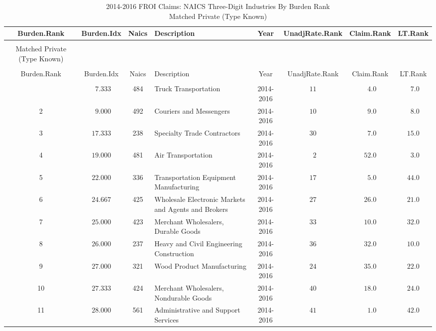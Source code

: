 \documentclass[9pt, oneside]{article}   	%
\begin{document}
\begin{longtable}{cccp{2.0in}cccc}
\caption{2014-2016 FROI Claims: NAICS Three-Digit Industries By Burden Rank\\ Matched Private (Type Known)}\\ 
\toprule
 Burden.Rank & Burden.Idx & Naics & Description & Year & UnadjRate.Rank & Claim.Rank & \multicolumn{1}{c}{LT.Rank} \\ 
   \midrule
   \hline
\endfirsthead
\caption[]{2014-2016 FROI Claims: NAICS Three-Digit Industries By Burden Rank\\ Matched Private (Type Known)}\\ 


\label{Table: 10b_burdenFull}\\

\hline
\toprule
 Burden.Rank & Burden.Idx & Naics & Description & Year & UnadjRate.Rank & Claim.Rank & \multicolumn{1}{c}{LT.Rank} \\ 
   \midrule\\ [-1\normalbaselineskip]\hline\endhead\hline\endfoot
1  & $\phantom{0}7.333$ & 484 & Truck Transportation & 2014-2016 & $11$ & $\phantom{0}4.0$ & $\phantom{0}7.0$ \\
2  & $\phantom{0}9.000$ & 492 & Couriers and Messengers & 2014-2016 & $10$ & $\phantom{0}9.0$ & $\phantom{0}8.0$ \\
3  & $17.333$ & 238 & Specialty Trade Contractors & 2014-2016 & $30$ & $\phantom{0}7.0$ & $15.0$ \\
4  & $19.000$ & 481 & Air Transportation & 2014-2016 & $\phantom{0}2$ & $52.0$ & $\phantom{0}3.0$ \\
5  & $22.000$ & 336 & Transportation Equipment Manufacturing & 2014-2016 & $17$ & $\phantom{0}5.0$ & $44.0$ \\
6  & $24.667$ & 425 & Wholesale Electronic Markets and Agents and Brokers & 2014-2016 & $27$ & $26.0$ & $21.0$ \\
7  & $25.000$ & 423 & Merchant Wholesalers, Durable Goods & 2014-2016 & $33$ & $10.0$ & $32.0$ \\
8  & $26.000$ & 237 & Heavy and Civil Engineering Construction & 2014-2016 & $36$ & $32.0$ & $10.0$ \\
9  & $27.000$ & 321 & Wood Product Manufacturing & 2014-2016 & $24$ & $35.0$ & $22.0$ \\
10  & $27.333$ & 424 & Merchant Wholesalers, Nondurable Goods & 2014-2016 & $40$ & $18.0$ & $24.0$ \\
11  & $28.000$ & 561 & Administrative and Support Services & 2014-2016 & $41$ & $\phantom{0}1.0$ & $42.0$ \\

\end{longtable}
\end{document}
